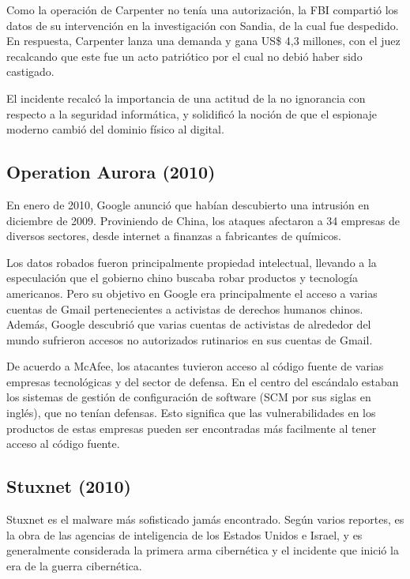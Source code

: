 \documentclass{article}
\begin{document}
Como la operación de Carpenter no tenía una autorización, la FBI compartió los datos de su intervención en la investigación con Sandia, de la cual fue despedido. En respuesta, Carpenter lanza una demanda y gana US\$ 4,3 millones, con el juez recalcando que este fue un acto patriótico por el cual no debió haber sido castigado.

El incidente recalcó la importancia de una actitud de la no ignorancia con respecto a la seguridad informática, y solidificó la noción de que el espionaje moderno cambió del dominio físico al digital. \autocite{computerworld-titan-rain}

\subsection{Operation Aurora (2010)}
En enero de 2010, Google anunció que habían descubierto una intrusión en diciembre de 2009. Proviniendo de China, los ataques afectaron a 34 empresas de diversos sectores, desde internet a finanzas a fabricantes de químicos. 

Los datos robados fueron principalmente propiedad intelectual, llevando a la especulación que el gobierno chino buscaba robar productos y tecnología americanos. Pero su objetivo en Google era principalmente el acceso a varias cuentas de Gmail pertenecientes a activistas de derechos humanos chinos. Además, Google descubrió que varias cuentas de activistas de alrededor del mundo sufrieron accesos no autorizados rutinarios en sus cuentas de Gmail. \autocite{google-aurora}

De acuerdo a McAfee, los atacantes tuvieron acceso al código fuente de varias empresas tecnológicas y del sector de defensa. En el centro del escándalo estaban los sistemas de gestión de configuración de software (SCM por sus siglas en inglés), que no tenían defensas. Esto significa que las vulnerabilidades en los productos de estas empresas pueden ser encontradas más facilmente al tener acceso al código fuente. \autocite{wired-aurora}

\subsection{Stuxnet (2010)}
Stuxnet es el malware más sofisticado jamás encontrado. Según varios reportes, es la obra de las agencias de inteligencia de los Estados Unidos e Israel, y es generalmente considerada la primera arma cibernética y el incidente que inició la era de la guerra cibernética.
\end{document}
